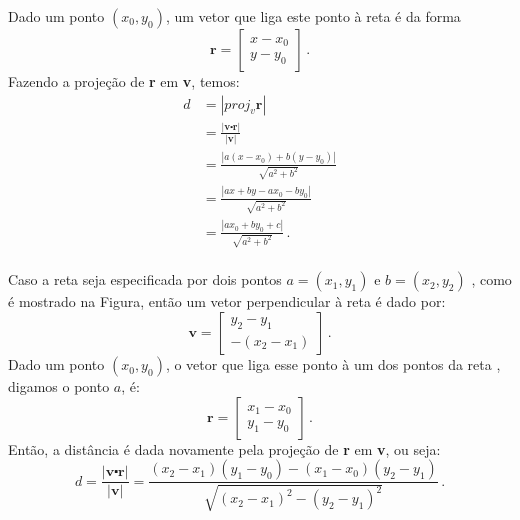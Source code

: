 Dado um ponto $(x_0, y_0)$, um vetor que liga este ponto à reta é da forma
\begin{equation*}
\textbf{r}=\left[ \begin{array}{c} x-x_0\\ y-y_0 \end{array} \right]\,.
\end{equation*}
Fazendo a projeção de \textbf{r} em \textbf{v}, temos:
\begin{equation*}
\begin{aligned}
d&=|proj_v\textbf{r}| \\
&=\frac{|\textbf{v}\centerdot \textbf{r}|}{|\textbf{v}|} \\
&=\frac{|a(x-x_0)+b(y-y_0)|}{\sqrt{a^2+b^2}} \\
&=\frac{|ax+by-ax_0-by_0|}{\sqrt{a^2+b^2}} \\
&=\frac{|ax_0+by_0+c|}{\sqrt{a^2+b^2}}\,. \\
\end{aligned}
\end{equation*}

Caso a reta seja especificada por dois pontos $a=(x_1, y_1)$ e
$b=(x_2, y_2)$ , como é mostrado na Figura, então um vetor
perpendicular à reta é dado por:
\begin{equation*}
\textbf{v}=\left[ \begin{array}{c} y_2-y_1 \\ -(x_2-x_1) \end{array}\right] \,.
\end{equation*}
Dado um ponto $(x_0, y_0)$, o vetor que liga esse ponto à um dos pontos da reta
, digamos o ponto $a$, é:
\begin{equation*}
\textbf{r}=\left[ \begin{array}{c} x_1-x_0 \\ y_1-y_0\end{array}\right] \,.
\end{equation*}
Então, a distância é dada novamente pela projeção de \textbf{r} em \textbf{v},
ou seja:
\begin{equation*}
d =\frac{|\textbf{v}\centerdot \textbf{r}|}{|\textbf{v}|} =
\frac{(x_2-x_1)(y_1-y_0)-(x_1-x_0)(y_2-y_1)}{\sqrt{(x_2-x_1)^2-(y_2-y_1)^2}}\,.
\end{equation*}
\nocite{point2line}